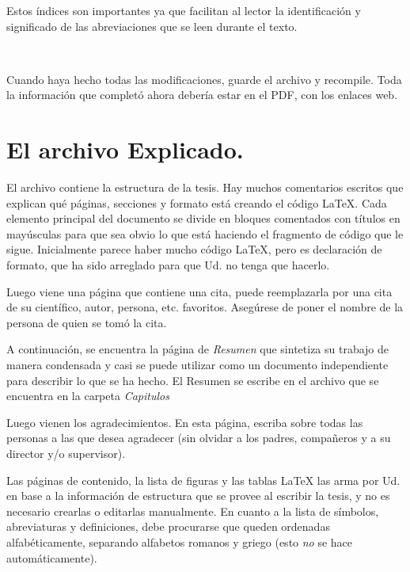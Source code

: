 Estos índices son importantes ya que facilitan al lector la identificación y significado de las abreviaciones que se leen durante el texto. 

\

Cuando haya hecho todas las modificaciones, guarde el archivo y recompile. Toda la información que completó ahora debería estar en el PDF, con los enlaces web. 




\section{El archivo  Explicado.}

El archivo  contiene la estructura de la tesis. Hay muchos comentarios escritos que explican qué páginas, secciones y formato está creando el código \LaTeX{}. Cada elemento principal del documento se divide en bloques comentados con títulos en mayúsculas para que sea obvio lo que está haciendo el  fragmento de código que le sigue. Inicialmente parece haber mucho código \LaTeX{}, pero es declaración de  formato, que ha sido arreglado para que Ud. no tenga que hacerlo.

Luego viene una página que contiene una cita, puede reemplazarla por una cita de su científico, autor, persona, etc. favoritos. Asegúrese de poner el nombre de la persona de quien se tomó la cita.

A continuación, se encuentra la página de \emph{Resumen} que sintetiza su trabajo de manera condensada y casi se puede utilizar como un documento independiente para describir lo que se ha hecho. El Resumen se escribe en el archivo  que se encuentra en la carpeta \emph{Capitulos}


Luego vienen los agradecimientos. En esta página, escriba sobre todas las personas a las que desea agradecer (sin olvidar a los padres, compañeros y a su director y/o supervisor).

Las páginas de contenido, la lista de figuras y las tablas \LaTeX{}  las arma por Ud. en base a la información de estructura que se provee al escribir la tesis, y no es necesario crearlas o editarlas manualmente. En cuanto a la lista de símbolos, abreviaturas y definiciones, debe procurarse que queden ordenadas alfabéticamente, separando alfabetos romanos y griego (esto \emph{no} se hace automáticamente). 

